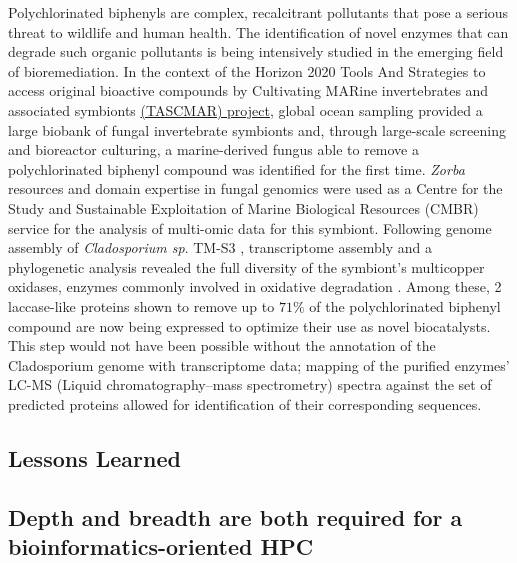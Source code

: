    Polychlorinated biphenyls are complex, recalcitrant pollutants that pose a serious threat to wildlife and human health. 
   The identification of novel enzymes that can degrade such organic pollutants is being intensively studied in the emerging field of bioremediation. 
   In the context of the Horizon 2020 Tools And Strategies to access original bioactive compounds by Cultivating MARine invertebrates and associated symbionts \href{http://www.tascmar.eu/}{(TASCMAR) project}, global ocean sampling provided a large biobank of fungal invertebrate symbionts and, through large-scale screening and bioreactor culturing, a marine-derived fungus able to remove a polychlorinated biphenyl compound was identified for the first time. 
   \textit{Zorba} resources and domain expertise in fungal genomics were used as a Centre for the Study and Sustainable Exploitation of Marine Biological Resources (CMBR) service for the analysis of multi-omic data for this symbiont. Following genome assembly of \textit{Cladosporium sp}. 
   TM-S3 \citep{gioti2020draft}, transcriptome assembly and a phylogenetic analysis revealed the full diversity of the symbiont's multicopper oxidases, enzymes commonly involved in oxidative degradation \citep{nikolaivits2021functional}. 
   Among these, 2 laccase-like proteins shown to remove up to $71\%$ of the polychlorinated biphenyl compound are now being expressed to optimize their use as novel biocatalysts. 
   This step would not have been possible without the annotation of the Cladosporium genome with transcriptome data; 
   mapping of the purified enzymes' LC-MS (Liquid chromatography–mass spectrometry) spectra against the set of predicted proteins allowed for identification of their corresponding sequences.



   \subsection{Lessons Learned}

   \subsection*{Depth and breadth are both required for a bioinformatics-oriented HPC}

